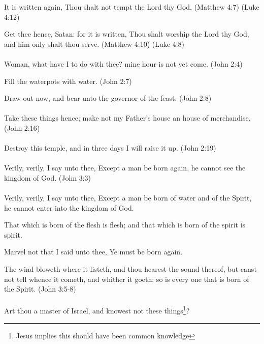 It is written again, Thou shalt not tempt the Lord thy God. (Matthew 4:7) (Luke 4:12)

Get thee hence, Satan: for it is written, Thou shalt worship the Lord thy God, and him only shalt thou serve. (Matthew 4:10) (Luke 4:8)

\paragraph{} Woman, what have I to do with thee? mine hour is not yet come. (John 2:4)

Fill the waterpots with water. (John 2:7)

Draw out now, and bear unto the governor of the feast. (John 2:8)

\paragraph{} Take these things hence; make not my Father's house an house of merchandise. (John 2:16)

\paragraph{} Destroy this temple, and in three days I will raise it up. (John 2:19)

\paragraph{} Verily, verily, I say unto thee, Except a man be born again, he cannot see the kingdom of God. (John 3:3)

\paragraph{} Verily, verily, I say unto thee, Except a man be born of water and of the Spirit, he cannot enter into the kingdom of God.

That which is born of the flesh is flesh; and that which is born of the spirit is spirit.

Marvel not that I said unto thee, Ye must be born again.

The wind bloweth where it listeth, and thou hearest the sound thereof, but canst not tell whence it cometh, and whither it goeth: so is every one that is born of the Spirit. (John 3:5-8)

\paragraph{} Art thou a master of Israel, and knowest not these things\footnote{Jesus implies this should  have been common knowledge}?


